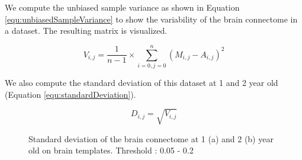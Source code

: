 \documentclass[]{spie}  %
\begin{document}
We compute the unbiased sample variance as shown in Equation \ref{equ:unbiasedSampleVariance} to show the variability of the brain connectome in a dataset. The resulting matrix is visualized. 

\begin{equation}
	V_{i,j} = \frac{1}{n-1} \times \sum_{i=0, j=0}^n {(M_{i,j} - A_{i,j})^2}
	\label{equ:unbiasedSampleVariance}
\end{equation}

We also compute the standard deviation of this dataset at 1 and 2 year old (Equation \ref{equ:standardDeviation}).

\begin{equation}
	D_{i,j} = \sqrt{V_{i,j}}
	\label{equ:standardDeviation}
\end{equation}

\begin{figure}
\centering 
{}
\caption[Standard deviation of the brain connectome at 1 (a) and 2 (b) year old on brain templates ]{Standard deviation of the brain connectome at 1 (a) and 2 (b) year old on brain templates. Threshold : 0.05 - 0.2}
\label{fig:DeviationBrainConnectome}
\end{figure} 
\end{document}
